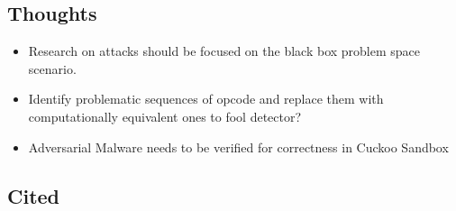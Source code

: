 \documentclass{article}
\begin{document}
\subsection*{Thoughts}
\begin{itemize}
	\item Research on attacks should be focused on the black box problem space scenario.
	\item Identify problematic sequences of opcode and replace them with computationally equivalent ones to fool detector?
	\item Adversarial Malware needs to be verified for correctness in Cuckoo Sandbox
\end{itemize}

\subsection*{Cited}
\end{document}
